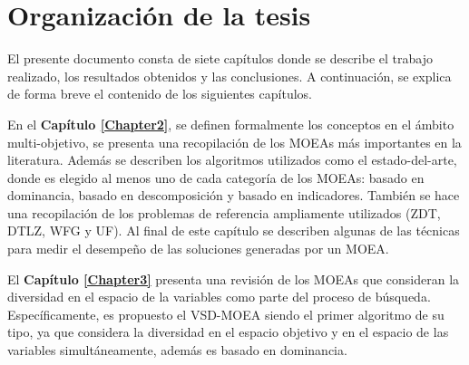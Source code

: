 


\section{Organización de la tesis}

El presente documento consta de siete capítulos donde se describe el trabajo realizado, los resultados obtenidos y las conclusiones.
%
A continuación, se explica de forma breve el contenido de los siguientes capítulos.
%

En el \textbf{Capítulo \ref{Chapter2}}, se definen formalmente los conceptos en el ámbito multi-objetivo, se presenta una recopilación de los MOEAs más importantes en la literatura.
%
Además se describen los algoritmos utilizados como el estado-del-arte, donde es elegido al menos uno de cada categoría de los MOEAs: basado en dominancia, basado en descomposición y basado en indicadores.
%
También se hace una recopilación de los problemas de referencia ampliamente utilizados (ZDT, DTLZ, WFG y UF).
%
Al final de este capítulo se describen algunas de las técnicas para medir el desempeño de las soluciones generadas por un MOEA.
%

El \textbf{Capítulo \ref{Chapter3}} presenta una revisión de los MOEAs que consideran la diversidad en el espacio de la variables como parte del proceso de búsqueda.
%
Específicamente, es propuesto el VSD-MOEA siendo el primer algoritmo de su tipo, ya que considera la diversidad en el espacio objetivo y en el espacio de las variables simultáneamente, además es basado en dominancia.
%

